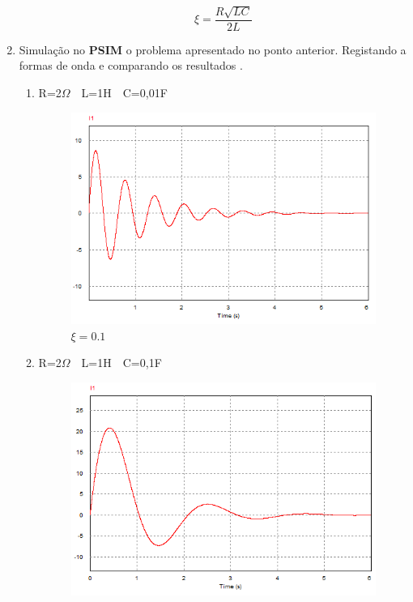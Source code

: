 \documentclass[titlepage, a4paper, 11pt, reqno, openany]{report}
\begin{document}
\begin{enumerate}
\begin{enumerate}
%
\begin{equation}
\xi=\frac{R\sqrt{LC}}{2L}
\end{equation}
%
\end{enumerate}
\item
Simula\c{c}\~{a}o  no {\bf PSIM} o problema  apresentado  no ponto anterior. Registando  a formas  de onda  e comparando  os resultados .\par
%
\begin{enumerate}
\item
R=2$\Omega$\ \  L=1H\ \  C=0,01F\par
\begin{figure}[H]
\centering
\includegraphics[scale=1]{./image/PSIM_12.png}
\caption{$\xi=0.1$}
\label{figura 24}
\end{figure}\par
\item
R=2$\Omega$\ \  L=1H\ \  C=0,1F\par
\begin{figure}[H]
\centering
\includegraphics[scale=1]{./image/PSIM_13.png}

\end{figure}
\end{enumerate}
\end{enumerate}
\end{document}
